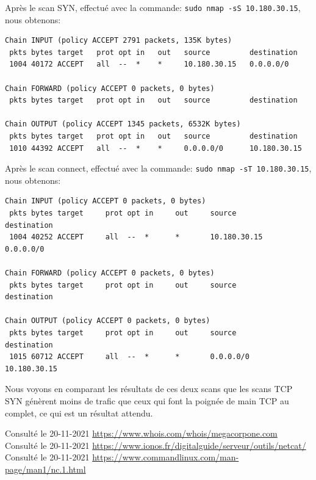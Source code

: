 \documentclass[french,paper=a4,oneside,captions=tableheading]{article}
\begin{document}
Après le scan SYN, effectué avec la commande: \texttt{sudo nmap -sS 10.180.30.15}, nous obtenons:
\begin{example}
\begin{Verbatim}
Chain INPUT (policy ACCEPT 2791 packets, 135K bytes)
 pkts bytes target   prot opt in   out   source         destination
 1004 40172 ACCEPT   all  --  *    *     10.180.30.15   0.0.0.0/0

Chain FORWARD (policy ACCEPT 0 packets, 0 bytes)
 pkts bytes target   prot opt in   out   source         destination

Chain OUTPUT (policy ACCEPT 1345 packets, 6532K bytes)
 pkts bytes target   prot opt in   out   source         destination
 1010 44392 ACCEPT   all  --  *    *     0.0.0.0/0      10.180.30.15
\end{Verbatim}
\end{example}

Après le scan connect, effectué avec la commande: \texttt{sudo nmap -sT 10.180.30.15}, nous obtenons:
\begin{example}
\begin{Verbatim}
Chain INPUT (policy ACCEPT 0 packets, 0 bytes)
 pkts bytes target     prot opt in     out     source               destination 
 1004 40252 ACCEPT     all  --  *      *       10.180.30.15         0.0.0.0/0

Chain FORWARD (policy ACCEPT 0 packets, 0 bytes)
 pkts bytes target     prot opt in     out     source               destination

Chain OUTPUT (policy ACCEPT 0 packets, 0 bytes)
 pkts bytes target     prot opt in     out     source               destination 
 1015 60712 ACCEPT     all  --  *      *       0.0.0.0/0            10.180.30.15
\end{Verbatim}
\end{example}

Nous voyons en comparant les résultats de ces deux scans que les scans TCP SYN génèrent moins de trafic que ceux qui font la poignée de main TCP au complet, ce qui est un résultat attendu.















\newpage \listoffigures %
\newpage
\begin{thebibliography}{9}
 Consulté le 20-11-2021 \url{https://www.whois.com/whois/megacorpone.com}
 Consulté le 20-11-2021 \url{https://www.ionos.fr/digitalguide/serveur/outils/netcat/}
 Consulté le 20-11-2021 \url{https://www.commandlinux.com/man-page/man1/nc.1.html}
\end{thebibliography}
\end{document}
